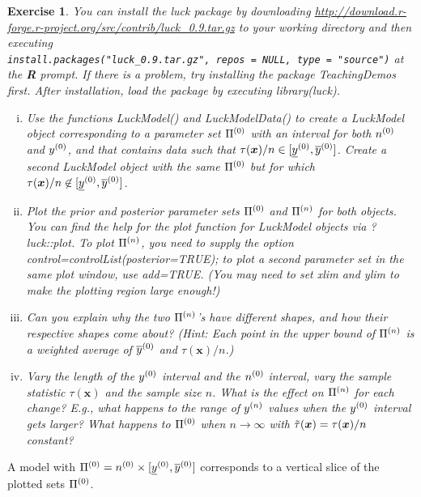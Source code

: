 \documentclass[12pt,a4paper	,twoside]{article}
\newcommand{\bs}[1]{\boldsymbol{#1}}
\renewcommand{\vec}[1]{{\bs#1}}
\newcommand{\code}[1]{\emph{\ttfamily #1}}
\newtheorem{myex}{Exercise}
\begin{document}
\begin{myex}
You can install the \code{luck} package 
by downloading \emph{\url{http://download.r-forge.r-project.org/src/contrib/luck_0.9.tar.gz}}
to your working directory and then executing\\
\verb+install.packages("luck_0.9.tar.gz", repos = NULL, type = "source")+
at the \textbf{R} prompt.
If there is a problem, try installing the package \code{TeachingDemos} first.
After installation, load the package by executing \code{library(luck)}.
\begin{enumerate}[(i)]
\item Use the functions \code{LuckModel()} and \code{LuckModelData()}
to create a \code{LuckModel} object corresponding to a parameter set $\Pi^{(0)}$ with an interval for both $n^{(0)}$ and $y^{(0)}$,
and that contains data such that $\tau(\vec{x})/n \in [\yzl, \yzu]$.
Create a second \code{LuckModel} object with the same $\Pi^{(0)}$ but for which $\tau(\vec{x})/n \not\in [\yzl, \yzu]$.
\item Plot the prior and posterior parameter sets $\Pi^{(0)}$ and $\Pi^{(n)}$ for both objects.
You can find the help for the plot function for \code{LuckModel} objects via \code{?luck::plot}.
To plot $\Pi^{(n)}$, you need to supply the option \code{control=controlList(posterior=TRUE)};
to plot a second parameter set in the same plot window, use \code{add=TRUE}.
(You may need to set \code{xlim} and \code{ylim} to make the plotting region large enough!)
\item Can you explain why the two $\Pi^{(n)}$'s have different shapes,
and how their respective shapes come about?
(Hint: Each point in the upper bound of $\Pi^{(n)}$ is a weighted average of $\overline{y}^{(0)}$ and $\tau(\vec{x})/n$.)
\item Vary the length of the $y^{(0)}$ interval and the $n^{(0)}$ interval,
vary the sample statistic $\tau(\vec{x})$ and the sample size $n$.
What is the effect on $\Pi^{(n)}$ for each change?
E.g., what happens to the range of $y^{(n)}$ values when the $y^{(0)}$ interval gets larger?
What happens to $\Pi^{(0)}$ when $n \to \infty$ with $\ttau(\vec{x}) = \tau(\vec{x})/n$ constant?
\end{enumerate}
\end{myex}
A model with $\Pi^{(0)} = n^{(0)} \times [\underline{y}^{(0)}, \overline{y}^{(0)}]$ corresponds to a vertical slice of the plotted sets $\Pi^{(0)}$.
\end{document}
